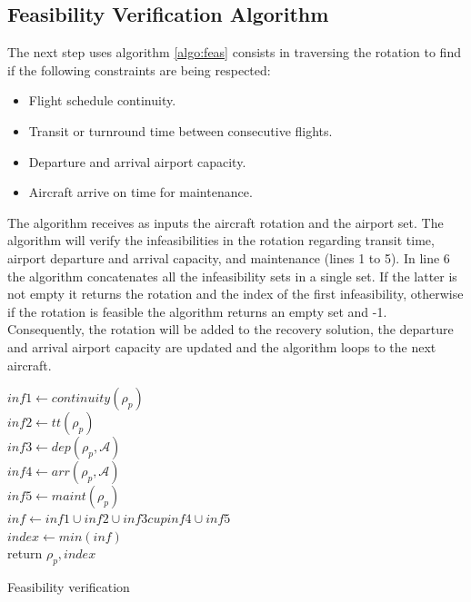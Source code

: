 \subsection{Feasibility Verification Algorithm} \label{sec:feasVer}

The next step uses algorithm \ref{algo:feas} consists in traversing the rotation to find  if the following constraints are being respected:\\

\begin{itemize}
	\item Flight schedule continuity.\\
	\item Transit or turnround time between consecutive flights.\\
	\item Departure and arrival airport capacity.\\
	\item Aircraft arrive on time for maintenance.\\
\end{itemize}

The algorithm receives as inputs the aircraft rotation and the airport set. The algorithm will  verify the infeasibilities in the rotation regarding transit time, airport departure and arrival capacity, and maintenance (lines 1 to 5). In line 6 the algorithm concatenates all the infeasibility sets in a single set. If the latter is not empty it returns the rotation and the index of the first infeasibility, otherwise if the rotation is feasible the algorithm returns an empty set and -1. Consequently, the rotation will be added to the recovery solution, the departure and arrival airport capacity are updated and the algorithm loops to the next aircraft.



	\begin{algorithm}[H]
		\DontPrintSemicolon
		$inf1 \gets continuity(\rho_p)$\\		%
		$inf2 \gets tt(\rho_p)$\\ 		%
		$inf3 \gets dep(\rho_p, \mathcal{A})$\\%
		$inf4 \gets arr(\rho_p, \mathcal{A})$\\%
		$inf5 \gets maint(\rho_p)$\\ %
		$inf \gets inf1 \cup inf2 \cup inf3 cup inf4 \cup inf5$\\
		{
			$index \gets min(inf)$\\
			return $\rho_p, index$\\
		}
		\caption{Feasibility verification}
		\label{algo:feas}
	\end{algorithm}

